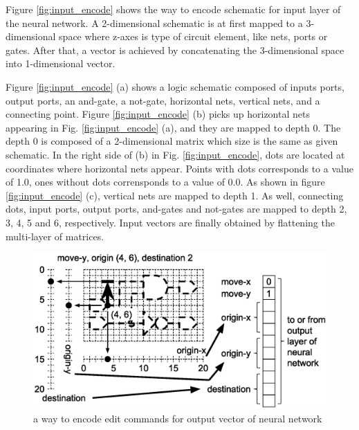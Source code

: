 \documentclass[twocolumn]{article}
\begin{document}
Figure \ref{fig:input_encode} shows the way to encode schematic
for input layer of the neural network.
A 2-dimensional schematic is at first mapped to a 3-dimensional space
where z-axes is type of circuit element, like nets, ports or gates.
After that, a vector is achieved by concatenating the 3-dimensional space
into 1-dimensional vector.

Figure \ref{fig:input_encode} (a) shows a logic schematic composed of
inputs ports, output ports, an and-gate, a not-gate,
horizontal nets, vertical nets, and a connecting point.
Figure \ref{fig:input_encode} (b) picks up horizontal nets appearing
in Fig. \ref{fig:input_encode} (a), and they are mapped to depth 0.
The depth 0 is composed of a 2-dimensional matrix which size is the same
as given schematic.
In the right side of (b) in Fig. \ref{fig:input_encode},
dots are located at coordinates where horizontal nets appear.
Points with dots corresponds to a value of 1.0, ones without dots
corrensponds to a value of 0.0.
As shown in figure \ref{fig:input_encode} (c),
vertical nets are mapped to depth 1.
As well, connecting dots, input ports, output ports, and-gates and not-gates
are mapped to depth 2, 3, 4, 5 and 6, respectively.
Input vectors are finally obtained by flattening the multi-layer of matrices.

\begin{figure}[!tp]
 \begin{center}
  \begin{minipage}{\hsize}
   \includegraphics[width=\hsize]{output_encode_02.eps}
   \caption{a way to encode edit commands for output vector of neural network}
   \label{fig:output_encode}
  \end{minipage}
 \end{center}
\end{figure}
\end{document}
